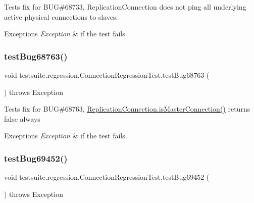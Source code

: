 Tests fix for B\+UG\#68733, Replication\+Connection does not ping all underlying active physical connections to slaves.


\begin{DoxyExceptions}{Exceptions}
{\em Exception} & if the test fails. \\
\hline
\end{DoxyExceptions}
\mbox{\label{classtestsuite_1_1regression_1_1_connection_regression_test_ad20cb3d4d184371c5cbf7e540726e6a6}} 
\subsubsection{\texorpdfstring{test\+Bug68763()}{testBug68763()}}
{\footnotesize\ttfamily void testsuite.\+regression.\+Connection\+Regression\+Test.\+test\+Bug68763 (\begin{DoxyParamCaption}{ }\end{DoxyParamCaption}) throws Exception}

Tests fix for B\+UG\#68763, \mbox{\hyperlink{interfacecom_1_1mysql_1_1cj_1_1jdbc_1_1_jdbc_connection_a012dc133872dd4d6db6d6f98118d3251}{Replication\+Connection.\+is\+Master\+Connection()}} returns false always


\begin{DoxyExceptions}{Exceptions}
{\em Exception} & if the test fails. \\
\hline
\end{DoxyExceptions}
\mbox{\label{classtestsuite_1_1regression_1_1_connection_regression_test_a83cf8c588a6543301dab7d3afa57042b}} 
\subsubsection{\texorpdfstring{test\+Bug69452()}{testBug69452()}}
{\footnotesize\ttfamily void testsuite.\+regression.\+Connection\+Regression\+Test.\+test\+Bug69452 (\begin{DoxyParamCaption}{ }\end{DoxyParamCaption}) throws Exception}

